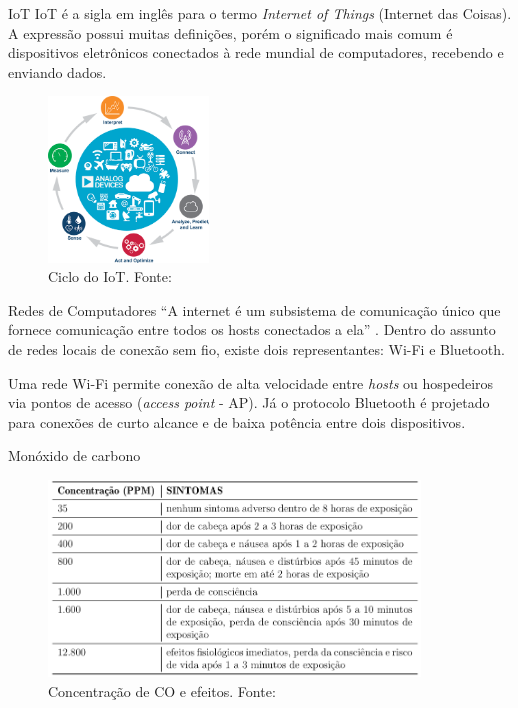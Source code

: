 \documentclass[12pt]{beamer}
\begin{document}
    \begin{frame}{IoT}
        IoT é a sigla em inglês para o termo \textit{Internet of Things} (Internet das Coisas). 
        A expressão possui muitas definições, porém o significado mais comum é dispositivos eletrônicos 
        conectados à rede mundial de computadores, recebendo e enviando dados.
        \begin{figure}[ht]
            \centering
            \includegraphics[width=0.38\textwidth]{img/iot-cycle.png}
            \caption{Ciclo do IoT. Fonte: \cite{iot-cycle}}\label{fig:cycleIoT}
        \end{figure}
    \end{frame}

    \begin{frame}{Redes de Computadores}
        ``A internet é um subsistema de comunicação único que fornece comunicação entre todos os hosts conectados a ela'' \cite[pp. 96]{sistemas-distribuidos-coulouris2013}. Dentro do 
        assunto de redes locais de conexão sem fio, existe dois representantes: Wi-Fi e Bluetooth. 
        
        Uma rede Wi-Fi permite conexão de alta velocidade entre \textit{hosts} ou hospedeiros via 
        pontos de acesso (\textit{access point} - AP). Já o protocolo Bluetooth é projetado para conexões de curto alcance e de baixa potência entre dois dispositivos.
    \end{frame}

    \begin{frame}{Monóxido de carbono}
        \begin{figure}[ht]
            \centering
            \includegraphics[width=0.88\textwidth]{img/tab-concentracao-co.png}
            \caption{Concentração de CO e efeitos. Fonte: \cite{seguranca-contra-incendios}}\label{fig:co}
        \end{figure}
    \end{frame}    
\end{document}
